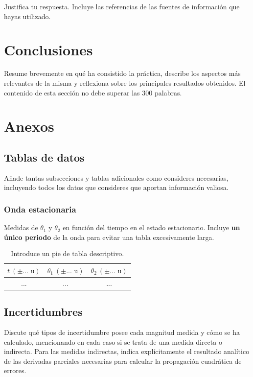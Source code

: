 \documentclass[a4paper,11pt]{article}
\begin{document}
Justifica tu respuesta. Incluye las referencias de las fuentes de información que hayas utilizado.

\section{Conclusiones}

Resume brevemente en qué ha consistido la práctica, describe los aspectos más relevantes de la misma y reflexiona sobre los principales resultados obtenidos. El contenido de esta sección no debe superar las 300 palabras.

\appendix

\section{Anexos}

\subsection{Tablas de datos}

Añade tantas subsecciones y tablas adicionales como consideres necesarias, incluyendo todos los datos que consideres que aportan información valiosa.

\subsubsection{Onda estacionaria}
Medidas de $\theta_1$ y $\theta_2$ en función del tiempo en el estado estacionario. Incluye \textbf{un único periodo} de la onda para evitar una tabla excesivamente larga.

\begin{table}[ht!]
    \centering
    \begin{tabular}{c|c|c}
    $t\ (\pm ...\text{ u})$ & $\theta_1\ (\pm ...\text{ u})$ & $\theta_2\ (\pm ...\text{ u})$\\
    \hline
    ... & ... & ... \\
    \hline
    \end{tabular}
    \caption{Introduce un pie de tabla descriptivo.}
    \label{tab:R-T}
\end{table}

\subsection{Incertidumbres}

Discute qué tipos de incertidumbre posee cada magnitud medida y cómo se ha calculado, mencionando en cada caso si se trata de una medida directa o indirecta. Para las medidas indirectas, indica explícitamente el resultado analítico de las derivadas parciales necesarias para calcular la propagación cuadrática de errores.
\end{document}
